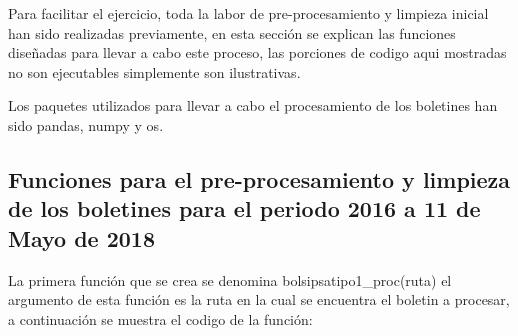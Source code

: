 \documentclass[
]{book}
\begin{document}
Para facilitar el ejercicio, toda la labor de pre-procesamiento y limpieza inicial han sido realizadas previamente, en esta sección se explican las funciones diseñadas para llevar a cabo este proceso, las porciones de codigo aqui mostradas no son ejecutables simplemente son ilustrativas.

Los paquetes utilizados para llevar a cabo el procesamiento de los boletines han sido pandas, numpy y os.

\hypertarget{funciones-para-el-pre-procesamiento-y-limpieza-de-los-boletines-para-el-periodo-2016-a-11-de-mayo-de-2018}{%
\subsection{Funciones para el pre-procesamiento y limpieza de los boletines para el periodo 2016 a 11 de Mayo de 2018}\label{funciones-para-el-pre-procesamiento-y-limpieza-de-los-boletines-para-el-periodo-2016-a-11-de-mayo-de-2018}}

La primera función que se crea se denomina bolsipsatipo1\_proc(ruta) el argumento de esta función es la ruta en la cual se encuentra el boletin a procesar, a continuación se muestra el codigo de la función:
\end{document}
